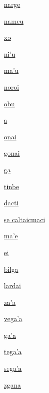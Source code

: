 {\hyperlink{val:narge}{narge}}{}{}{}

{\hyperlink{val:namcu}{namcu}}{}{}{}

{\hyperlink{val:xo}{xo}}{}{}{}

{\hyperlink{val:nihu}{ni'u}}{}{}{}

{\hyperlink{val:mahu}{ma'u}}{}{}{}

{\hyperlink{val:noroi}{noroi}}{}{}{}

{\hyperlink{val:obu}{obu}}{}{}{}

{\hyperlink{val:a}{a}}{}{}{}

{\hyperlink{val:onai}{onai}}{}{}{}

{\hyperlink{val:gonai}{gonai}}{}{}{}

{\hyperlink{val:ga}{ga}}{}{}{}

{\hyperlink{val:tinbe}{tinbe}}{}{}{}

{\hyperlink{val:dacti}{dacti}}{}{}{}

{\hyperlink{val:caltaicmaci}{se caltaicmaci}}{}{}{}

{\hyperlink{val:mahe}{ma'e}}{}{}{}

{\hyperlink{val:ei}{ei}}{}{}{}

{\hyperlink{val:bilga}{bilga}}{}{}{}

{\hyperlink{val:lardai}{lardai}}{}{}{}

{\hyperlink{val:zaha}{za'a}}{}{}{}

{\hyperlink{val:vegaha}{vega'a}}{}{}{}

{\hyperlink{val:gaha}{ga'a}}{}{}{}

{\hyperlink{val:tegaha}{tega'a}}{}{}{}

{\hyperlink{val:segaha}{sega'a}}{}{}{}

{\hyperlink{val:zgana}{zgana}}{}{}{}

